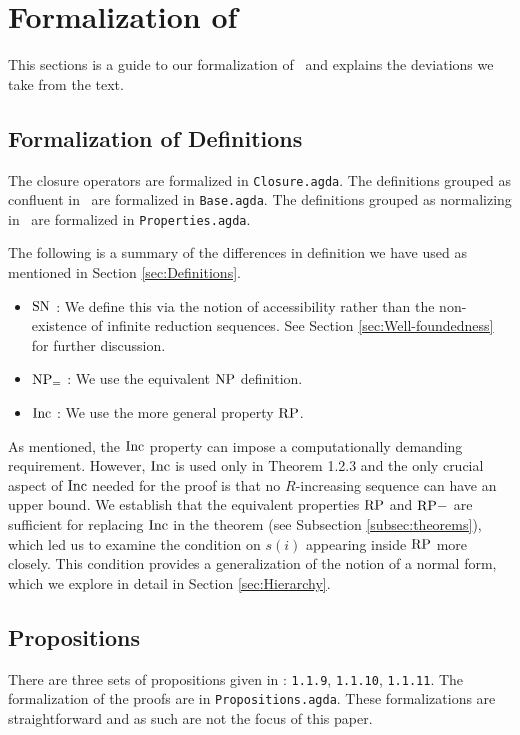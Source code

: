 \section{Formalization of \terese}
\label{sec:Formalization}
This sections is a guide to our formalization of \terese $\,$ and explains the deviations we take from the text.  

\subsection{Formalization of Definitions}\label{subsec:def}
The closure operators are formalized in \texttt{Closure.agda}. 
The definitions grouped as confluent in \terese $\,$ are formalized in \texttt{Base.agda}. 
The definitions grouped as normalizing in \terese $\,$ are formalized in \texttt{Properties.agda}.  

The following is a summary of the differences in definition we have used as mentioned in Section \ref{sec:Definitions}. 
\begin{itemize}
    \item $\mathrm{SN}$ : We define this via the notion of accessibility rather than the non-existence of infinite reduction sequences. 
     See Section \ref{sec:Well-foundedness} for further discussion.
    \item $\mathrm{NP_=}$ : We use the equivalent $\mathrm{NP}$ definition. 
    \item $\mathrm{Inc}$ : We use the more general property $\mathrm{RP}$.      
\end{itemize}

As mentioned, the $\mathrm{Inc}$ property can impose a computationally demanding requirement. However, $\mathrm{Inc}$ is used only in Theorem 1.2.3 
and the only crucial aspect of $\mathrm{Inc}$ needed for the proof is that no $R$-increasing 
sequence can have an upper bound.
We establish that the equivalent properties $\mathrm{RP}$ and $\mathrm{RP{-}}$ are sufficient for replacing $\mathrm{Inc}$ in the theorem (see Subsection \ref{subsec:theorems}), 
which led us to examine the condition on $s (i)$ appearing inside $\mathrm{RP}$ more closely. This condition provides a generalization of the notion of a normal form, 
which we explore in detail in Section \ref{sec:Hierarchy}. 

\subsection{Propositions}
There are three sets of propositions given in \terese: \texttt{1.1.9}, \texttt{1.1.10}, \texttt{1.1.11}. 
The formalization of the proofs are in \texttt{Propositions.agda}. These formalizations are straightforward 
and as such are not the focus of this paper. 

